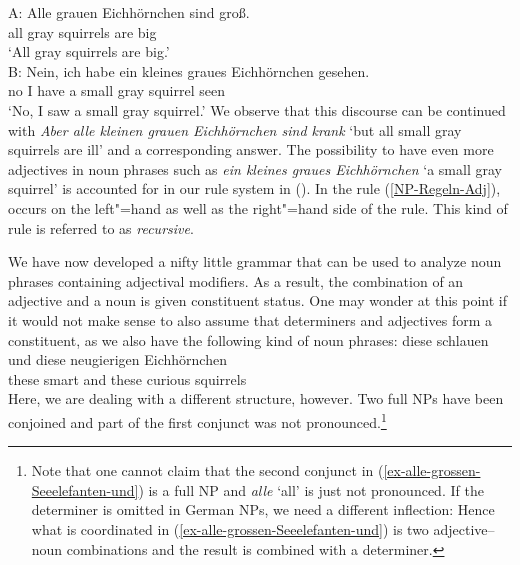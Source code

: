 \ea
\label{Beispiel-Iteration-Adjektive}
\gll A: Alle grauen Eichhörnchen sind groß.\\
\spacebr{} all gray squirrels are big\\
\glt \hphantom{A:~}`All gray squirrels are big.'\\
\gll B: Nein, ich habe ein kleines graues Eichhörnchen gesehen.\\
	\spacebr{} no I have a small gray squirrel seen\\
\glt \hphantom{B:~}`No, I saw a small gray squirrel.'
\z
We observe that this discourse can be continued with \emph{Aber alle kleinen grauen Eichhörnchen
  sind krank} `but all small gray squirrels are ill' and a corresponding answer. The possibility
  to have even more adjectives in noun phrases such as \emph{ein kleines graues Eichhörnchen} `a
  small gray squirrel' is accounted for in our rule system in (). In the rule
  (\ref{NP-Regeln-Adj}), \nbar occurs on the left"=hand as well as the right"=hand 
  side of the rule. This kind of rule is referred to as \emph{recursive}.

We have now developed a nifty little grammar that can be used to analyze noun phrases containing
adjectival modifiers. As a result, the combination of an adjective and a noun is given constituent
status. One may wonder at this point if it would not make sense to also assume that determiners and
adjectives form a constituent, as we also have the following kind of noun phrases: 
\ea
\gll diese schlauen und diese neugierigen Eichhörnchen\\
     these smart    and these curious     squirrels\\
\z
Here, we are dealing with a different structure, however. Two full NPs have been
conjoined and part of the first conjunct was not pronounced.\footnote{
  Note that one cannot claim that the second conjunct in (\ref{ex-alle-grossen-Seeelefanten-und}) is
  a full NP and \emph{alle} `all' is just not pronounced. If the determiner is omitted in German
  NPs, we need a different inflection:
\eal
{}
\zl
Hence what is coordinated in (\ref{ex-alle-grossen-Seeelefanten-und}) is two adjective--noun
combinations and the result is combined with a determiner.
}

